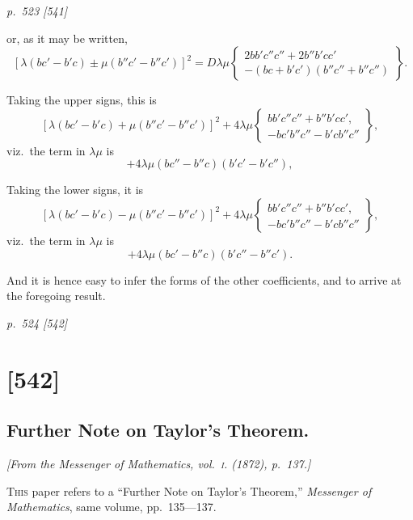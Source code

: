 \documentclass[11pt,a4paper]{article}
\theoremstyle{plain}
\theoremstyle{definition}
\newcommand{\sourcepage}[2]{%
  \bigskip
  \noindent\textit{p.~#1 [#2]}%
  \par\smallskip
}
\begin{document}
\clearpage

\bigskip
\textit{p.~523 [541]}
\smallskip

or, as it may be written,
\[
[\lambda (bc' - b'c) \pm \mu (b''c' - b''c')]^2 = D\lambda\mu \left\{ \begin{array}{l} 2bb'c''c'' + 2b''b'cc' \\ -(bc + b'c')(b''c'' + b''c'') \end{array} \right\}.
\]

Taking the upper signs, this is
\[
[\lambda (bc' - b'c) + \mu (b''c' - b''c')]^2 + 4\lambda\mu \left\{ \begin{array}{l} bb'c''c'' + b''b'cc', \\ -bc'b''c'' - b'cb''c'' \end{array} \right\},
\]
viz.\ the term in $\lambda\mu$ is
\[
+ 4\lambda\mu (bc'' - b''c)(b'c' - b'c''),
\]

Taking the lower signs, it is
\[
[\lambda (bc' - b'c) - \mu (b''c' - b''c')]^2 + 4\lambda\mu \left\{ \begin{array}{l} bb'c''c'' + b''b'cc', \\ -bc'b''c'' - b'cb''c'' \end{array} \right\},
\]
viz.\ the term in $\lambda\mu$ is
\[
+ 4\lambda\mu (bc' - b''c)(b'c'' - b''c').
\]

And it is hence easy to infer the forms of the other coefficients, and to arrive at the foregoing result.

\clearpage


\sourcepage{524}{542}
\section{[542]}
\subsection{Further Note on Taylor's Theorem.}

\begin{center}
\textit{[From the Messenger of Mathematics, vol.~\textsc{i}. (1872), p.~137.]}
\end{center}

\textsc{This} paper refers to a ``Further Note on Taylor's Theorem,''
\textit{Messenger of Mathematics}, same volume, pp.~135---137.
\end{document}
